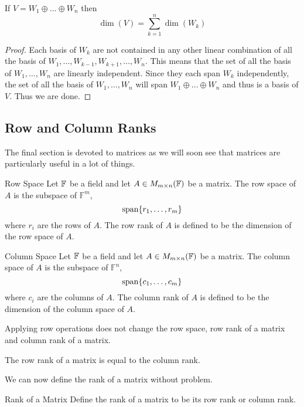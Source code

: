 \documentclass[a4paper]{article}
\begin{document}
\begin{crl}{}{} If $V=W_1\oplus\dots\oplus W_n$ then $$\dim(V)=\sum_{k=1}^n\dim(W_k)$$ \tcbline
\begin{proof}
Each basis of $W_k$ are not contained in any other linear combination of all the basis of $W_1,\dots,W_{k-1},W_{k+1},\dots,W_n$. This means that the set of all the basis of $W_1,\dots,W_n$ are linearly independent. Since they each span $W_k$ independently, the set of all the basis of $W_1,\dots,W_n$ will span $W_1\oplus\dots\oplus W_n$ and thus is a basis of $V$. Thus we are done. 
\end{proof}
\end{crl}

\subsection{Row and Column Ranks}
The final section is devoted to matrices as we will soon see that matrices are particularly useful in a lot of things. 
\begin{defn}{Row Space}{} Let $\mathbb{F}$ be a field and let $A\in M_{m\times n}(\mathbb{F})$ be a matrix. The row space of $A$ is the subspace of $\mathbb{F}^m$, $$\operatorname{span}\{r_1,\dots,r_m\}$$ where $r_i$ are the rows of $A$. The row rank of $A$ is defined to be the dimension of the row space of $A$. 
\end{defn}

\begin{defn}{Column Space}{} Let $\mathbb{F}$ be a field and let $A\in M_{m\times n}(\mathbb{F})$ be a matrix. The column space of $A$ is the subspace of $\mathbb{F}^n$, $$\operatorname{span}\{c_1,\dots,c_m\}$$ where $c_i$ are the columns of $A$. The column rank of $A$ is defined to be the dimension of the column space of $A$. 
\end{defn}

\begin{lmm}{}{} Applying row operations does not change the row space, row rank of a matrix and column rank of a matrix. 
\end{lmm}

\begin{thm}{}{} The row rank of a matrix is equal to the column rank. 
\end{thm}

We can now define the rank of a matrix without problem. 

\begin{defn}{Rank of a Matrix}{} Define the rank of a matrix to be its row rank or column rank. 
\end{defn}
\end{document}
